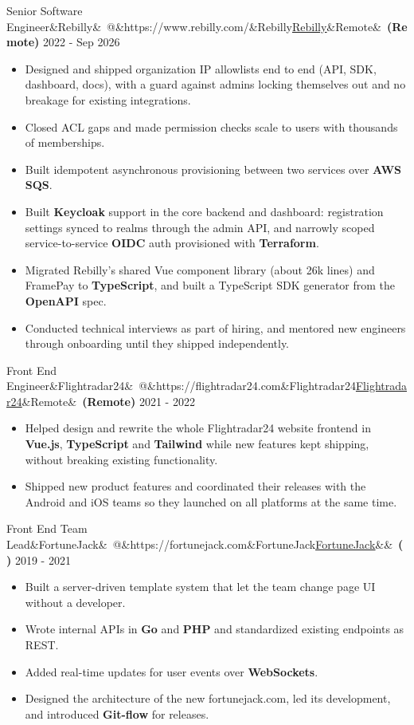 \documentclass[10pt]{article}
\makeatletter
\newcommand{\weblink}[2]{\href{#1}{\textcolor{linkblue}{\underline{#2}}}}
\newcommand{\role}[5]{%
  \vspace{5pt}\par\noindent
  {\normalsize #1\ifx&#2&\else\ @\ifx&#3&#2\else\weblink{#3}{#2}\fi\fi\ifx&#4&\else\ \textbf{(#4)}\fi}%
  \hfill{\footnotesize #5}\par\nopagebreak\vspace{1pt}}
\makeatother
\begin{document}
\role{Senior Software Engineer}{Rebilly}{https://www.rebilly.com/}{Remote}{2022 - Sep 2026}
\begin{itemize}
  \item Designed and shipped organization IP allowlists end to end (API, SDK, dashboard, docs), with a guard against admins locking themselves out and no breakage for existing integrations.
  \item Closed ACL gaps and made permission checks scale to users with thousands of memberships.
  \item Built idempotent asynchronous provisioning between two services over \textbf{AWS SQS}.
  \item Built \textbf{Keycloak} support in the core backend and dashboard: registration settings synced to realms through the admin API, and narrowly scoped service-to-service \textbf{OIDC} auth provisioned with \textbf{Terraform}.
  \item Migrated Rebilly's shared Vue component library (about 26k lines) and FramePay to \textbf{TypeScript}, and built a TypeScript SDK generator from the \textbf{OpenAPI} spec.
  \item Conducted technical interviews as part of hiring, and mentored new engineers through onboarding until they shipped independently.
\end{itemize}

\role{Front End Engineer}{Flightradar24}{https://flightradar24.com}{Remote}{2021 - 2022}
\begin{itemize}
  \item Helped design and rewrite the whole Flightradar24 website frontend in \textbf{Vue.js}, \textbf{TypeScript} and \textbf{Tailwind} while new features kept shipping, without breaking existing functionality.
  \item Shipped new product features and coordinated their releases with the Android and iOS teams so they launched on all platforms at the same time.
\end{itemize}

\role{Front End Team Lead}{FortuneJack}{https://fortunejack.com}{}{2019 - 2021}
\begin{itemize}
  \item Built a server-driven template system that let the team change page UI without a developer.
  \item Wrote internal APIs in \textbf{Go} and \textbf{PHP} and standardized existing endpoints as REST.
  \item Added real-time updates for user events over \textbf{WebSockets}.
  \item Designed the architecture of the new fortunejack.com, led its development, and introduced \textbf{Git-flow} for releases.
\end{itemize}
\end{document}

